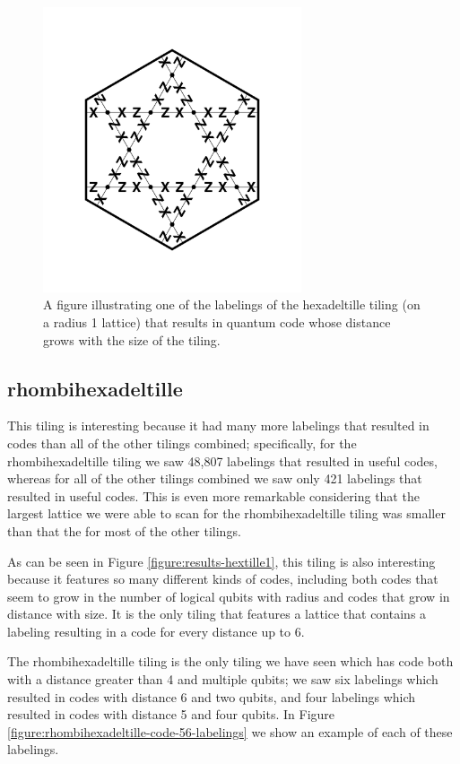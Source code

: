 \documentclass[12pt]{amsbook}
\theoremstyle{plain}
\theoremstyle{definition}
\theoremstyle{remark}
\begin{document}
\begin{figure}
\includegraphics[width=3in]{images/hexadeltille-code-labeling}
\caption{
\label{figure:hexadeltille-code-labeling}
A figure illustrating one of the labelings of the hexadeltille tiling (on a radius 1 lattice) that results in quantum code whose distance grows with the size of the tiling.
}
\end{figure}
\subsection{rhombihexadeltille}

This tiling is interesting because it had many more labelings that resulted in codes  than all of the other tilings combined;  specifically, for the rhombihexadeltille tiling we saw 48,807 labelings that resulted in useful codes, whereas for all of the other tilings combined we saw only 421 labelings that resulted in useful codes.  This is even more remarkable considering that the largest lattice we were able to scan for the rhombihexadeltille tiling was smaller than that the for most of the other tilings.

As can be seen in Figure \ref{figure:results-hextille1}, this tiling is also interesting because it features so many different kinds of codes, including both codes that seem to grow in the number of logical qubits with radius and codes that grow in distance with size.  It is the only tiling that features a lattice that contains a labeling resulting in a code for every distance up to 6.

The rhombihexadeltille tiling is the only tiling we have seen which has code both with a distance greater than 4 and multiple qubits;  we saw six labelings which resulted in codes with distance 6 and two qubits, and four labelings which resulted in codes with distance 5 and four qubits.  In Figure \ref{figure:rhombihexadeltille-code-56-labelings} we show an example of each of these labelings.
\end{document}
